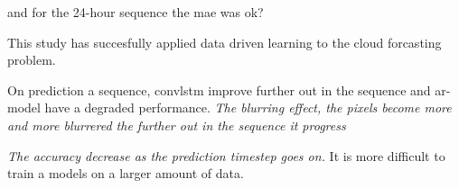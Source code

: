 and for the 24-hour sequence the mae was ok? 


This study has succesfully applied data driven learning to the cloud forcasting problem. 



On prediction a sequence, \acrshort{convlstm} improve further out in the sequence and \acrshort{ar}-model have a degraded performance.
\textit{The blurring effect, the pixels become more and more blurrered the further out in the sequence it progress}

\textit{The accuracy decrease as the prediction timestep goes on.}
It is more difficult to train a models on a larger amount of data. 

